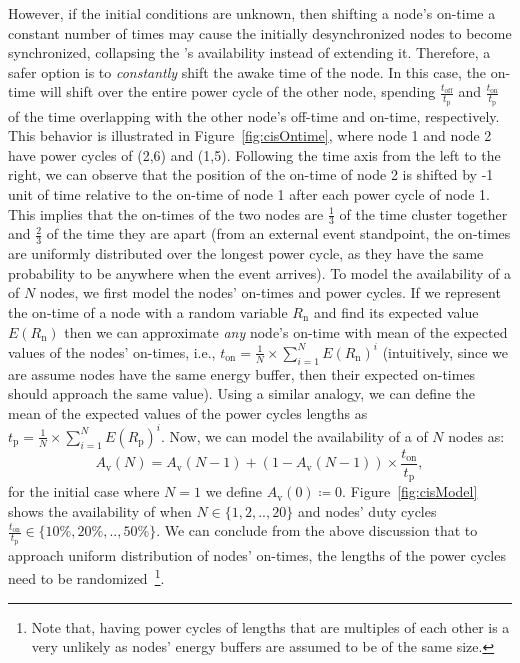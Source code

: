However, if the initial conditions are unknown, then shifting a node's on-time a constant number of times may cause the initially desynchronized nodes to become synchronized, collapsing the \cis's availability instead of extending it. Therefore, a safer option is to \emph{constantly} shift the awake time of the node. In this case, the on-time will shift over the entire power cycle of the other node, spending $\frac{ t_\text{off} }{t_\text{p}}$ and $\frac{ t_\text{on} }{t_\text{p}}$ of the time overlapping with the other node's off-time and on-time, respectively. This behavior is illustrated in Figure~\ref{fig:cisOntime}, where node 1 and node 2 have power cycles of (2,6) and (1,5). Following the time axis from the left to the right, we can observe that the position of the on-time of node 2 is shifted by -1 unit of time relative to the on-time of node 1 after each power cycle of node 1. This implies that the on-times of the two nodes are $\frac{1}{3}$ of the time cluster together and $\frac{2}{3}$ of the time they are apart (from an external event standpoint, the on-times are uniformly distributed over the longest power cycle, as they have the same probability to be anywhere when the event arrives). To model the availability of a \cis of $N$ nodes, we first model the nodes' on-times and power cycles.
%
If we represent the on-time of a node with a random variable $R_\text{n}$ and find its expected value $E(R_\text{n})$ then we can approximate \emph{any} \cis node's on-time with mean of the expected values of the nodes' on-times, i.e., $t_\text{on} = \frac{1}{N} \times \sum_{i=1}^{N} E(R_\text{n})^i$ (intuitively, since we are assume \cis nodes have the same energy buffer, then their expected on-times should approach the same value). Using a similar analogy, we can define the mean of the expected values of the power cycles lengths as $t_\text{p} = \frac{1}{N} \times \sum_{i=1}^{N} E(R_\text{p})^i$. Now, we can model the availability of a \cis of $N$ nodes as:
%
%	
\begin{equation}
	A_\text{v}(N) = A_\text{v}(N-1) + \left(1-A_\text{v}(N-1)\right) \times \frac{t_\text{on}}{t_\text{p}},
		\label{eq:cisModel}
\end{equation}
%
for the initial case where $N=1$ we define $A_\text{v}(0)\coloneqq 0$. Figure~\ref{fig:cisModel} shows the availability of \cis when $N\in\{1,2,..,20\}$ and nodes' duty cycles $\frac{t_\text{on}}{t_\text{p}}\in\{10\%,20\%,..,50\%\}$.
%
We can conclude from the above discussion that to approach uniform distribution of nodes' on-times, the lengths of the power cycles need to be randomized~\footnote{Note that, having power cycles of lengths that are multiples of each other is a very unlikely as nodes' energy buffers are assumed to be of the same size.}. 

